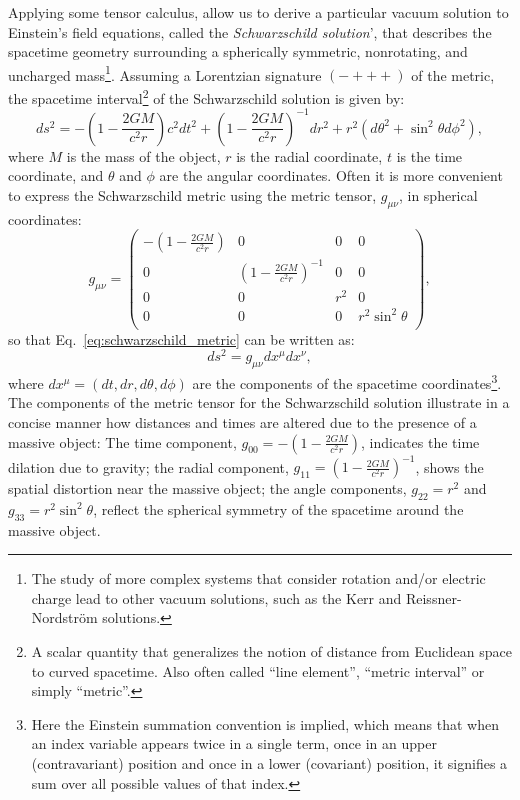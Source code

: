 \documentclass[main.tex]{subfiles}
\begin{document}
    Applying some tensor calculus, allow us to derive a particular vacuum solution to Einstein's field equations, called the \textit{Schwarzschild solution}', that describes the spacetime geometry surrounding a spherically symmetric, nonrotating, and uncharged mass\footnote{The study of more complex systems that consider rotation and/or electric charge lead to other vacuum solutions, such as the Kerr and Reissner-Nordstr\"om solutions.}. Assuming a Lorentzian signature $(- + + +)$ of the metric, the spacetime interval\footnote{A scalar quantity that generalizes the notion of distance from Euclidean space to curved spacetime. Also often called ``line element'', ``metric interval'' or simply ``metric''.} of the Schwarzschild solution is given by:
    \begin{equation}\label{eq:schwarzschild_metric}
        ds^2 = -\left(1 - \frac{2GM}{c^2r}\right)c^2dt^2 + \left(1 - \frac{2GM}{c^2r}\right)^{-1}dr^2 + r^2(d\theta^2 + \sin^2\theta d\phi^2),
    \end{equation}
    where $M$ is the mass of the object, $r$ is the radial coordinate, $t$ is the time coordinate, and $\theta$ and $\phi$ are the angular coordinates. 
    Often it is more convenient to express the Schwarzschild metric using the metric tensor, $g_{\mu \nu}$, in spherical coordinates:
    \begin{equation}\label{eq:schwarzschild_metric_matrix}
        g_{\mu\nu} = 
        \begin{pmatrix}
        -\left(1 - \frac{2GM}{c^2r}\right) & 0 & 0 & 0 \\
        0 & \left(1 - \frac{2GM}{c^2r}\right)^{-1} & 0 & 0 \\
        0 & 0 & r^2 & 0 \\
        0 & 0 & 0 & r^2\sin^2\theta \\
        \end{pmatrix},
    \end{equation}
    so that Eq.~\eqref{eq:schwarzschild_metric} can be written as:
    \begin{equation}\label{eq:schwarzschild_metric2}
        ds^2 = g_{\mu \nu}dx^\mu dx^\nu,
    \end{equation}
    where $dx^\mu = (dt, dr, d\theta, d\phi)$ are the components of the spacetime coordinates\footnote{Here the Einstein summation convention is implied, which means that when an index variable appears twice in a single term, once in an upper (contravariant) position and once in a lower (covariant) position, it signifies a sum over all possible values of that index.}.
    The components of the metric tensor for the Schwarzschild solution illustrate in a concise manner how distances and times are altered due to the presence of a massive object: The time component, $g_{00} = -\left(1 - \frac{2GM}{c^2r}\right)$, indicates the time dilation due to gravity; the radial component, $g_{11} = \left(1 - \frac{2GM}{c^2r}\right)^{-1}$, shows the spatial distortion near the massive object; the angle components, $g_{22} = r^2$ and $g_{33} = r^2\sin^2\theta$, reflect the spherical symmetry of the spacetime around the massive object. 
\end{document}
